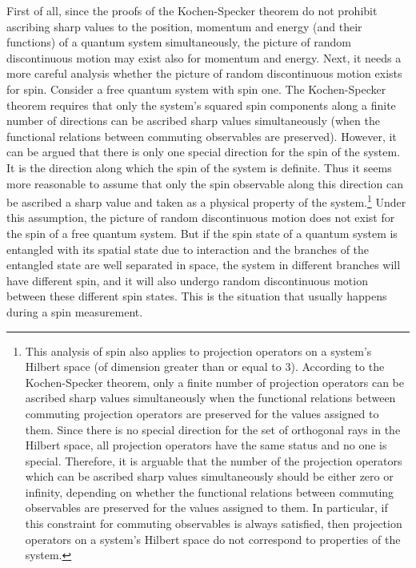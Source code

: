 First of all, since the proofs of the Kochen-Specker theorem do not prohibit ascribing sharp values to the position, momentum and energy (and their functions) of a quantum system simultaneously, the picture of random discontinuous motion may exist also for momentum and energy.
Next, it needs a more careful analysis whether the picture of random discontinuous motion exists for spin.
Consider a free quantum system with spin one.
The Kochen-Specker theorem requires that only the system's squared spin components along a finite number of directions  can be ascribed sharp values simultaneously (when the functional relations between commuting observables are preserved). 
However, it can be argued that there is only one special direction for the spin of the system.
It is the direction along which the spin of the system is definite.
Thus it seems more reasonable to assume that only the spin observable along this direction can be ascribed a  sharp value and taken as a physical property of the system.\footnote{This analysis of spin also applies to projection operators on a system's Hilbert space (of dimension greater than or equal to 3).
According to the Kochen-Specker theorem, only a finite number of projection operators can be ascribed sharp values simultaneously when the functional relations between commuting projection operators are preserved for the values assigned to them.
Since there is no special direction for the set of orthogonal rays in the Hilbert space, all projection operators have the same status and no one is special.
Therefore, it is arguable that the number of the projection operators which can be ascribed sharp values simultaneously should be either zero or infinity, depending on whether the functional relations between commuting observables are preserved for the values assigned to them.
In particular, if this constraint for commuting observables is always satisfied, then projection operators on a system's Hilbert space do not correspond to properties of the system.}
Under this assumption, the picture of random discontinuous motion does not exist for the spin of a free quantum system.
But if the spin state of a quantum system is entangled with its spatial state due to interaction and the branches of the entangled state are well separated in space, the system in different branches will have different spin, and it will also undergo random discontinuous motion between these different spin states. This is the situation that usually happens during a spin measurement.

